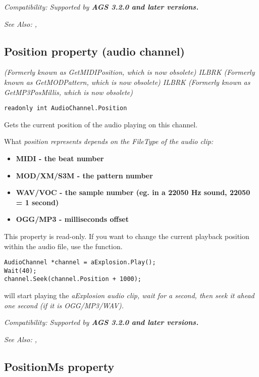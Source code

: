 \it{Compatibility:} Supported by \bf{AGS 3.2.0} and later versions.

\it{See Also:} , 


\subsection{Position property (audio channel)}\label{AudioChannel.Position}%

\it{(Formerly known as GetMIDIPosition, which is now obsolete)} ILBRK
\it{(Formerly known as GetMODPattern, which is now obsolete)} ILBRK
\it{(Formerly known as GetMP3PosMillis, which is now obsolete)}

\begin{verbatim}
readonly int AudioChannel.Position
\end{verbatim}
Gets the current position of the audio playing on this channel.

What \it{position} represents depends on the FileType of the audio clip:
\begin{itemize}
\item \bf{MIDI} - the beat number
\item \bf{MOD/XM/S3M} - the pattern number
\item \bf{WAV/VOC} - the sample number (eg. in a 22050 Hz sound, 22050 = 1 second)
\item \bf{OGG/MP3} - milliseconds offset
\end{itemize}

This property is read-only. If you want to change the current playback position within the audio file,
use the  function.

\begin{verbatim}
AudioChannel *channel = aExplosion.Play();
Wait(40);
channel.Seek(channel.Position + 1000);
\end{verbatim}
will start playing the \it{aExplosion} audio clip, wait for a second, then seek it ahead one second (if it is OGG/MP3/WAV).

\it{Compatibility:} Supported by \bf{AGS 3.2.0} and later versions.

\it{See Also:} ,


\subsection{PositionMs property}\label{AudioChannel.PositionMs}%

